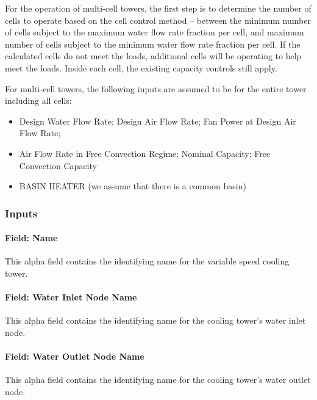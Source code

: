 For the operation of multi-cell towers, the first step is to determine the number of cells to operate based on the cell control method -- between the minimum number of cells subject to the maximum water flow rate fraction per cell, and maximum number of cells subject to the minimum water flow rate fraction per cell. If the calculated cells do not meet the loads, additional cells will be operating to help meet the loads. Inside each cell, the existing capacity controls still apply.

For multi-cell towers, the following inputs are assumed to be for the entire tower including all cells:

\begin{itemize}
\item
  Design Water Flow Rate; Design Air Flow Rate; Fan Power at Design Air Flow Rate;
\item
  Air Flow Rate in Free Convection Regime; Nominal Capacity; Free Convection Capacity
\item
  BASIN HEATER (we assume that there is a common basin)
\end{itemize}

\subsubsection{Inputs}\label{inputs-3-005}

\paragraph{Field: Name}\label{field-name-2-005}

This alpha field contains the identifying name for the variable speed cooling tower.

\paragraph{Field: Water Inlet Node Name}\label{field-water-inlet-node-name-3}

This alpha field contains the identifying name for the cooling tower's water inlet node.

\paragraph{Field: Water Outlet Node Name}\label{field-water-outlet-node-name-3}

This alpha field contains the identifying name for the cooling tower's water outlet node.

